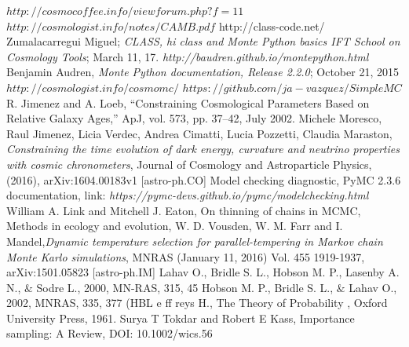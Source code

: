 \documentclass[onecolumn,           %
               showpacs,            %
               preprintnumbers,     %
               aps,                 %
               prl,          	    %
               letterpaper,             %
               superscriptaddress,      %
               nofootinbib,         %
               tightenlines,        %
               floats,floatfix      %
               ,usenatbib,
               ]{revtex4-1}
\begin{document}
\begin{thebibliography}{9}
$http://cosmocoffee.info/viewforum.php?f=11$
 $http://cosmologist.info/notes/CAMB.pdf$
 http://class-code.net/
Zumalacarregui Miguel; \textit{CLASS, hi class and Monte Python basics IFT School on Cosmology Tools}; March 11, 17.
\textit{http://baudren.github.io/montepython.html}
Benjamin Audren, \textit{Monte Python documentation, Release 2.2.0}; October 21, 2015
$http://cosmologist.info/cosmomc/$	
$https://github.com/ja-vazquez/SimpleMC$
%
%
%
%
%
%
R. Jimenez and A. Loeb, “Constraining Cosmological Parameters Based on Relative Galaxy Ages,”
ApJ, vol. 573, pp. 37–42, July 2002.
Michele Moresco, Raul Jimenez, Licia Verdec, Andrea Cimatti, Lucia Pozzetti, Claudia Maraston, \textit{Constraining the time evolution of dark energy, curvature and neutrino properties with cosmic chronometers}, Journal of Cosmology and Astroparticle Physics, (2016), arXiv:1604.00183v1 [astro-ph.CO]
 Model checking diagnostic, PyMC 2.3.6 documentation, link: \textit{https://pymc-devs.github.io/pymc/modelchecking.html}
William A. Link and Mitchell J. Eaton, On thinning of chains in MCMC, Methods in ecology and evolution,
W. D. Vousden, W. M. Farr and I. Mandel,\textit{Dynamic temperature selection for parallel-tempering in Markov chain Monte Karlo simulations}, MNRAS (January 11, 2016) Vol. 455 1919-1937, arXiv:1501.05823 [astro-ph.IM]
Lahav O., Bridle S. L., Hobson M. P., Lasenby A. N., $\&$ Sodre L., 2000, MN-RAS, 315, 45
Hobson M. P., Bridle S. L., $\&$ Lahav O., 2002, MNRAS, 335, 377 (HBL
e
ff
reys H.,
The Theory of Probability
, Oxford University Press, 1961.
Surya T Tokdar and Robert E Kass, Importance sampling: A Review, DOI: 10.1002/wics.56

\end{thebibliography}
\end{document}
